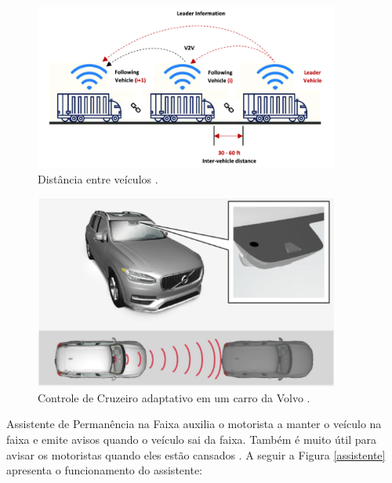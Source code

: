 \begin{figure}[H]
\centering
\includegraphics[width=10cm]{Figures/cruzeiro.png}
\caption{Distância entre veículos \cite{review-auto}.}
\label{cruzeiro}
\end{figure}


\begin{figure}[H]
\centering
\includegraphics[width=10cm]{Figures/ACC.png}
\caption{Controle de Cruzeiro adaptativo em um carro da Volvo \cite{caio}.}
\label{ACC}
\end{figure}



Assistente de Permanência na Faixa auxilia o motorista a manter o veículo na faixa e emite avisos quando o veículo sai da faixa. Também é muito útil para avisar os motoristas quando eles estão cansados \cite{caio}. A seguir a Figura \ref{assistente} apresenta o funcionamento do assistente:

